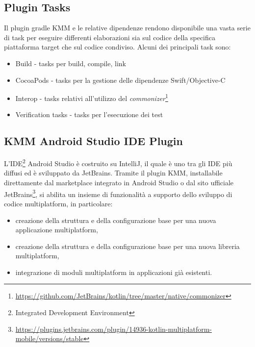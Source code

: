 \subsection{Plugin Tasks}
Il plugin gradle KMM e le relative dipendenze rendono disponibile una vasta serie di task per eseguire differenti elaborazioni sia sul codice della specifica piattaforma target che sul codice condiviso. Alcuni dei principali task sono:
\begin{itemize}
    \item Build - tasks per build, compile, link
    \item CocoaPods - tasks per la gestione delle dipendenze Swift/Objective-C
    \item Interop - tasks relativi all'utilizzo del \textit{commonizer}\footnote{\url{https://github.com/JetBrains/kotlin/tree/master/native/commonizer}}
    \item Verification tasks - tasks per l'esecuzione dei test
\end{itemize}

\subsection{KMM Android Studio IDE Plugin}
L'IDE\footnote{Integrated Development Environment} Android Studio è costruito su IntelliJ, il quale è uno tra gli IDE più diffusi ed è sviluppato da JetBrains. Tramite il plugin KMM, installabile direttamente dal marketplace integrato in Android Studio o dal sito ufficiale JetBrains\footnote{\url{https://plugins.jetbrains.com/plugin/14936-kotlin-multiplatform-mobile/versions/stable}}, si abilita un insieme di funzionalità a supporto dello sviluppo di codice multiplatform, in particolare:
\begin{itemize}
    \item creazione della struttura e della configurazione base per una nuova applicazione multiplatform,
    \item creazione della struttura e della configurazione base per una nuova libreria multiplatform,
    \item integrazione di moduli multiplatform in applicazioni già esistenti.
\end{itemize}
